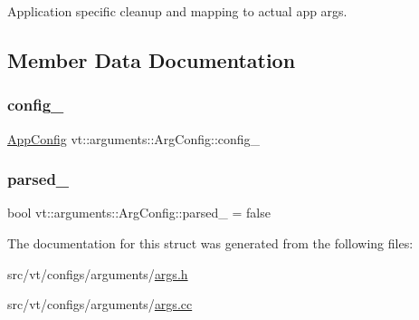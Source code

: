 Application specific cleanup and mapping to actual app args. 

\subsection{Member Data Documentation}
\mbox{\label{structvt_1_1arguments_1_1_arg_config_af30e0eae1ac1b29f7c85c25636109a9e}} 
\subsubsection{\texorpdfstring{config\+\_\+}{config\_}}
{\footnotesize\ttfamily \hyperlink{structvt_1_1arguments_1_1_app_config}{App\+Config} vt\+::arguments\+::\+Arg\+Config\+::config\+\_\+}

\mbox{\label{structvt_1_1arguments_1_1_arg_config_a710f4894651d38778f924c5d5f340d96}} 
\subsubsection{\texorpdfstring{parsed\+\_\+}{parsed\_}}
{\footnotesize\ttfamily bool vt\+::arguments\+::\+Arg\+Config\+::parsed\+\_\+ = false\hspace{0.3cm}{\ttfamily [private]}}



The documentation for this struct was generated from the following files\+:\begin{DoxyCompactItemize}
\item 
src/vt/configs/arguments/\hyperlink{args_8h}{args.\+h}\item 
src/vt/configs/arguments/\hyperlink{args_8cc}{args.\+cc}\end{DoxyCompactItemize}
